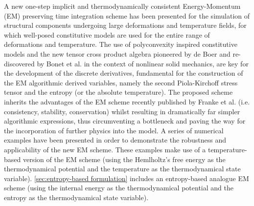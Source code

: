 


A new one-step implicit and thermodynamically consistent Energy-Momentum (EM) preserving time integration scheme has been presented for the simulation of structural components undergoing large deformations and temperature fields, for which well-posed constitutive models are used for the entire range of deformations and temperature. The use of polyconvexity inspired constitutive models and the new tensor cross product algebra pioneered by de Boer \cite{deBoer_book} and re-discovered by Bonet et al. \cite{Bonet_cross_product_2016} in the context of nonlinear solid mechanics, are key for the development of the discrete derivatives, fundamental for the construction of the EM algorithmic derived variables, namely the second Piola-Kirchoff stress tensor and the entropy (or the absolute temperature). The proposed scheme inherits the advantages of the EM scheme recently published by Franke et al. \cite{Betsch2018Thermo} (i.e. consistency, stability, conservation) whilst resulting in dramatically far simpler algorithmic expressions, thus circumventing a bottleneck and paving the way for the incorporation of further physics into the model. A series of numerical examples have been presented in order to demonstrate the robustness and applicability of the new EM scheme. These examples make use of a temperature-based version of the EM scheme (using the Hemlholtz's free energy as the thermodynamical potential and the temperature as the thermodynamical state variable). \ref{sec:entropy-based formulation} includes an entropy-based analogue EM scheme (using the internal energy as the thermodynamical potential and the entropy as the thermodynamical state variable).   



